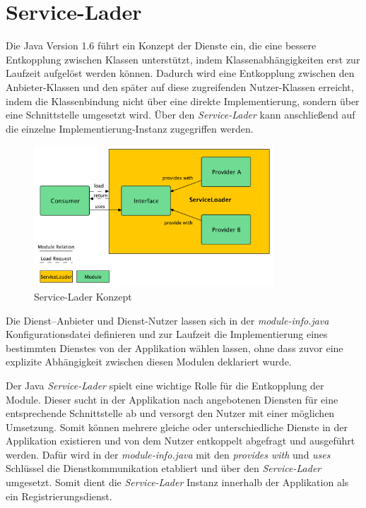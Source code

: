   \section{Service-Lader} \label{sec:servLoad} 
    Die Java Version 1.6 führt ein Konzept der Dienste ein, die eine bessere Entkopplung zwischen Klassen unterstützt, indem Klassenabhängigkeiten erst zur Laufzeit aufgelöst werden können. Dadurch wird eine Entkopplung zwischen den Anbieter-Klassen und den später auf diese zugreifenden Nutzer-Klassen erreicht, indem die Klassenbindung nicht über eine direkte Implementierung, sondern über eine Schnittstelle umgesetzt wird. Über den \textit{Service-Lader} kann anschließend auf die einzelne Implementierung-Instanz zugegriffen werden. \bigbreak
    \begin{figure}[h!]
      \centering
      \includegraphics[width=0.8\textwidth]{material/images/ServiceLoadingMulti.pdf}
      \caption{Service-Lader Konzept}
      \label{fig:serviceLoaderMulti}
    \end{figure}
    Die Dienst–Anbieter und Dienst-Nutzer lassen sich in der \textit{module-info.java} Konfigurationsdatei definieren und zur Laufzeit die Implementierung eines bestimmten Dienstes von der Applikation wählen lassen, ohne dass zuvor eine explizite Abhängigkeit zwischen diesen Modulen deklariert wurde. \bigbreak

    Der Java \textit{Service-Lader} spielt eine wichtige Rolle für die Entkopplung der Module. Dieser sucht in der Applikation nach angebotenen Diensten für eine entsprechende Schnittstelle ab und versorgt den Nutzer mit einer möglichen Umsetzung. Somit können mehrere gleiche oder unterschiedliche Dienste in der Applikation existieren und von dem Nutzer entkoppelt abgefragt und ausgeführt werden. Dafür wird in der \textit{module-info.java} mit den \textit{provides with} und \textit{uses} Schlüssel die Dienstkommunikation etabliert und über den \textit{Service-Lader} umgesetzt. Somit dient die \textit{Service-Lader} Instanz innerhalb der Applikation als ein Registrierungsdienst.\bigbreak


